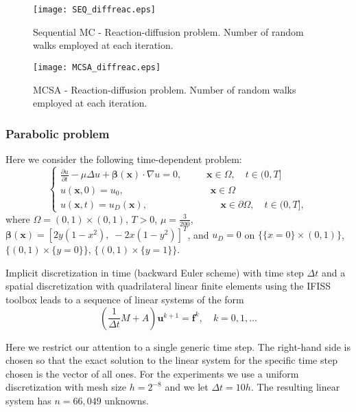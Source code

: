 \documentclass[final,leqno,onefignum,onetabnum]{siamltex1213}
\begin{document}
\begin{figure}
  \centering
    \texttt{[image: SEQ\_diffreac.eps]}
      \caption{Sequential MC - Reaction-diffusion problem. Number of random
walks
employed at each
 iteration.}
\label{SEQ_diffreac}
\end{figure}


\begin{figure}
  \centering
    \texttt{[image: MCSA\_diffreac.eps]}
      \caption{MCSA - Reaction-diffusion problem. Number of random walks
employed at each
iteration.}
\label{MCSA_diffreac}
\end{figure}

\subsubsection{Parabolic problem}

Here we consider the
following time-dependent problem:
\begin{equation}
 \begin{cases}\frac{\partial u}{\partial t} -\mu \Delta u
+\boldsymbol{\beta}(\mathbf{x})\cdot \nabla u=0, \;\; \quad \quad
\mathbf{x}\in \Omega,\quad t\in(0,T] \\
u(\mathbf{x},0) = u_0, \qquad \qquad \qquad \qquad \quad \mathbf{x}\in
\Omega \\
u(\mathbf{x},t)=u_D(\mathbf{x}),  \; \, \, \qquad \qquad \qquad \quad
\mathbf{x}\in \partial
\Omega, \quad t\in(0,T],
 \end{cases}
\end{equation}
where $\Omega = (0,1)\times (0,1)$, $T>0$,
$\mu=\frac{3}{200}$, $\boldsymbol{\beta}(\mathbf{x})=[2y(1-x^2),\;
-2x(1-y^2)]^T$, and $u_D=0$ on $\{\{x=0\}\times (0,1)\}$, $\{(0,1)\times
\{y=0\}\}$, $\{(0,1)\times \{y=1\}\}$.\newline

Implicit discretization in time (backward Euler scheme) with time step
$\Delta t$ and
a spatial discretization with quadrilateral linear finite elements using
the IFISS toolbox \cite{ifiss} leads
to a sequence of linear systems of the form
$$ \left (\frac{1}{\Delta t} M + A\right )\mathbf{u}^{k+1} =
\mathbf{f}^k, \quad k=0,1,\ldots $$

Here we restrict our attention to a single generic time step.
The right-hand side is chosen so that the exact
solution to the linear system for the specific time step chosen is
the vector of all ones. For the experiments we use a uniform discretization
with mesh size $h=2^{-8}$ and we let $\Delta t = 10h$.
The resulting linear system has $n=66,049$ unknowns.
\end{document}
